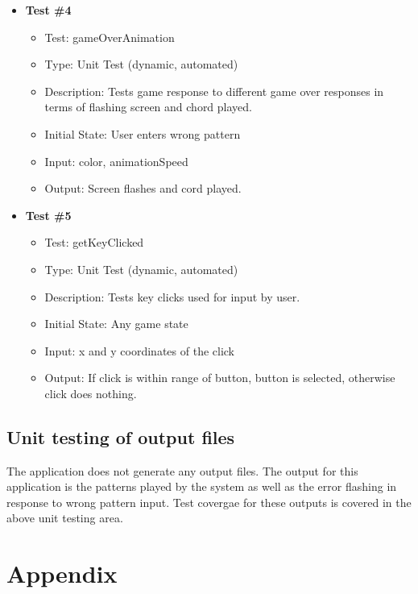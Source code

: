 \documentclass[12pt, titlepage]{article}
\begin{document}
\begin{itemize}
\item \textbf{Test \#4}
\begin{itemize}
\item Test: gameOverAnimation
\item Type: Unit Test (dynamic, automated)			
\item Description: Tests game response to different game over responses in terms of flashing screen and chord played.	
\item Initial State: User enters wrong pattern
\item Input: color, animationSpeed
\item Output: Screen flashes and cord played.		
\end{itemize}

\item \textbf{Test \#5}
\begin{itemize}
\item Test: getKeyClicked
\item Type: Unit Test (dynamic, automated)				
\item Description: Tests key clicks used for input by user.	
\item Initial State: Any game state 	
\item Input: x and y coordinates of the click
\item Output: If click is within range of button, button is selected, otherwise click does nothing.		
\end{itemize}

\end{itemize}

		
\subsection{Unit testing of output files}	
The application does not generate any output files. The output for this application is the patterns played by the system	as well as the error flashing in response to wrong pattern input. Test covergae for these outputs is covered in the above unit testing area.


\newpage
\section{Appendix}
\end{document}
